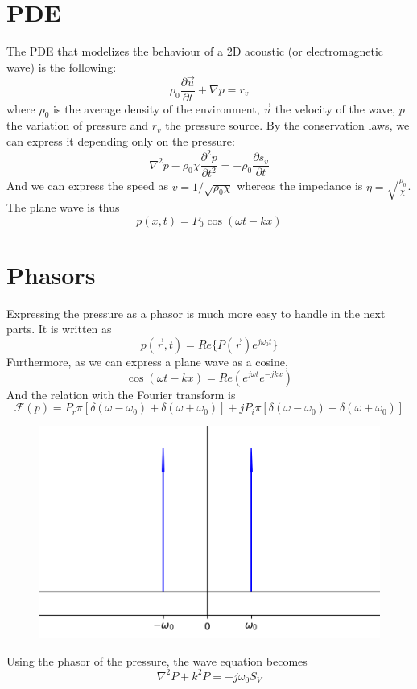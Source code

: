\documentclass[12pt, openany]{report}
\theoremstyle{definition}
\begin{document}
\section{PDE}
The PDE that modelizes the behaviour of a 2D acoustic (or electromagnetic wave) is the following:
\begin{equation}
  	\rho_0 \frac{\partial \vec u}{\partial t}+\nabla p = r_v
\end{equation}
where $\rho_0$ is the average density of the environment, $\vec u$ the velocity of the wave, $p$ the variation of pressure and $r_v$ the pressure source. By the conservation laws, we can express it depending only on the pressure:
\begin{equation}
	\nabla^2 p - \rho_0 \chi \frac{\partial^2 p}{\partial t^2} = -\rho_0 \frac{\partial s_v}{\partial t}
\end{equation}
And we can express the speed as $v=1/\sqrt{\rho_0 \chi}$ whereas the impedance is $\eta = \sqrt{\frac{\rho_0}{\chi}}$. The plane wave is thus 
\begin{equation}
	p(x,t) = P_0 \cos (\omega t-kx)
\end{equation}
\section{Phasors}
Expressing the pressure as a phasor is much more easy to handle in the next parts. It is written as 
\begin{equation}
	p(\vec r,t) = Re\{P(\vec r)e^{j\omega_0 t}\}
\end{equation}
Furthermore, as we can express a plane wave as a cosine, 
\begin{equation}
	\cos(\omega t-kx) = Re(e^{j\omega t}e^{-jkx})
\end{equation}
And the relation with the Fourier transform is 
\begin{equation}
	\mathcal{F}(p) = P_r \pi[\delta (\omega-\omega_0) + \delta (\omega+\omega_0)] + jP_i \pi [\delta(\omega-\omega_0) - \delta(\omega+\omega_0)]
\end{equation}
\begin{figure}[H]
	\centering 
	\includegraphics[width = .5\textwidth]{img/phasor.png}
\end{figure}
Using the phasor of the pressure, the wave equation becomes 
\begin{equation}
	\nabla^2 P + k^2 P = -j\omega_0 S_V
\end{equation}
\end{document}
